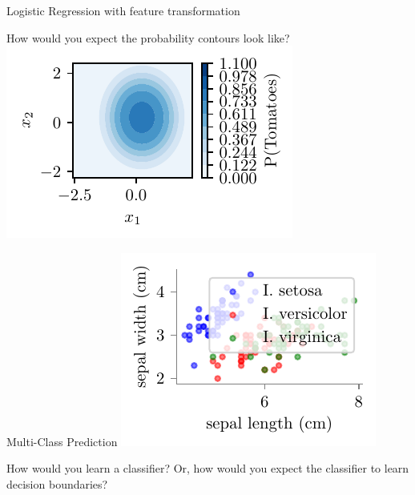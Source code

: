 \documentclass{beamer}
\begin{document}
\begin{frame}{Logistic Regression with feature transformation}

How would you expect the probability contours look like?
\pause \includegraphics{../figures/logistic-regression/logisitic-circular-probability.pdf}


\end{frame}

\begin{frame}{Multi-Class Prediction}
\includegraphics{../figures/logistic-regression/logisitic-iris.pdf}


\pause How would you learn a classifier? Or, how would you expect the classifier to learn decision boundaries?
\end{frame}
\end{document}
